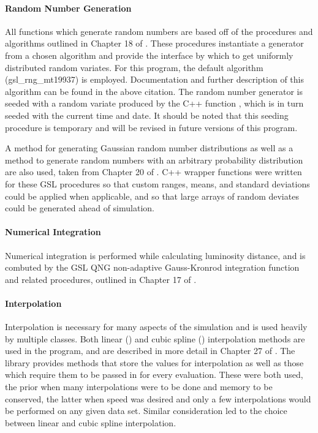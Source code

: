 \documentclass[twocolumn,letterpaper,10pt]{article}
\begin{document}
\paragraph{Random Number Generation}

All functions which generate random numbers are based off of the procedures and algorithms outlined in Chapter 18 of \citet{GSL}. These procedures instantiate a generator from a chosen algorithm and provide the interface by which to get uniformly distributed random variates. For this program, the default algorithm ({\sc gsl\_rng\_mt19937}) is employed. Documentation and further description of this algorithm can be found in the above citation. The random number generator is seeded with a random variate produced by the C++ function {}, which is in turn seeded with the current time and date. It should be noted that this seeding procedure is temporary and will be revised in future versions of this program. 

A method for generating Gaussian random number distributions as well as a method to generate random numbers with an arbitrary probability distribution are also used, taken from Chapter 20 of \citet{GSL}.  C++ wrapper functions were written for these GSL procedures so that custom ranges, means, and standard deviations could be applied when applicable, and so that large arrays of random deviates could be generated ahead of simulation.

\paragraph{Numerical Integration}

Numerical integration is performed while calculating luminosity distance, and is combuted by the GSL QNG non-adaptive Gauss-Kronrod integration function and related procedures, outlined in Chapter 17 of \citet{GSL}.

\paragraph{Interpolation}

Interpolation is necessary for many aspects of the simulation and is used heavily by multiple classes. Both linear ({}) and cubic spline ({}) interpolation methods are used in the program, and are described in more detail in Chapter 27 of \citet{GSL}. The library provides methods that store the values for interpolation as well as those which require them to be passed in for every evaluation. These were both used, the prior when many interpolations were to be done and memory to be conserved, the latter when speed was desired and only a few interpolations would be performed on any given data set. Similar consideration led to the choice between linear and cubic spline interpolation.
\end{document}
